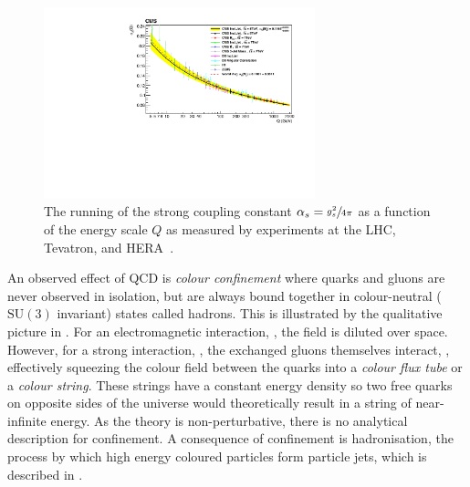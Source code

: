 \begin{figure}[h]
    \centering
    \includegraphics[width=0.7\textwidth]{Figures/standard_model/running}
    \caption{The running of the strong coupling constant $\alpha_s = \sfrac{g_s^2}{4\pi}$ as a function of the energy scale $Q$ as measured by experiments at the LHC, Tevatron, and HERA~\cite{CMSRunning}.}
    \label{fig:asymptotic_freedom}
\end{figure}

An observed effect of QCD is \textit{colour confinement} where quarks and gluons are never observed in isolation, but are always bound together in colour-neutral ($\text{SU}(3)$ invariant) states called hadrons.
This is illustrated by the qualitative picture in .
For an electromagnetic interaction, , the field is diluted over space.
However, for a strong interaction, , the exchanged gluons themselves interact, , effectively squeezing the colour field between the quarks into a \textit{colour flux tube} or a \textit{colour string}.
These strings have a constant energy density so two free quarks on opposite sides of the universe would theoretically result in a string of near-infinite energy.
As the theory is non-perturbative, there is no analytical description for confinement.
A consequence of confinement is hadronisation, the process by which high energy coloured particles form particle jets, which is described in .

